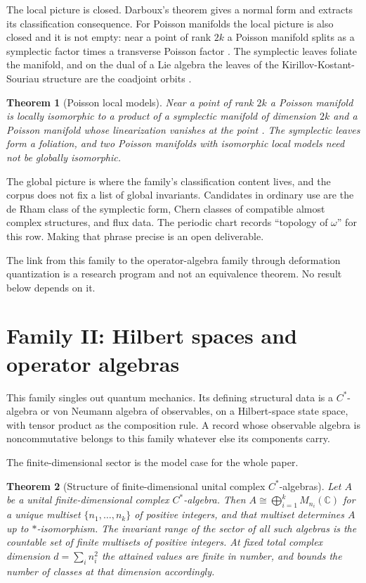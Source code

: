 \documentclass[11pt,letterpaper]{article}
\newtheorem{theorem}{Theorem}[section]
\theoremstyle{definition}
\theoremstyle{remark}
\begin{document}
The local picture is closed. Darboux's theorem gives a normal form and  extracts its classification consequence. For Poisson manifolds the local picture is also closed and it is not empty: near a point of rank $2k$ a Poisson manifold splits as a symplectic factor times a transverse Poisson factor \cite{poisson}. The symplectic leaves foliate the manifold, and on the dual of a Lie algebra the leaves of the Kirillov-Kostant-Souriau structure are the coadjoint orbits \cite{poisson}.

\begin{theorem}[Poisson local models]
\label{thm:weinstein}
Near a point of rank $2k$ a Poisson manifold is locally isomorphic to a product of a symplectic manifold of dimension $2k$ and a Poisson manifold whose linearization vanishes at the point \cite{weinstein}. The symplectic leaves form a foliation, and two Poisson manifolds with isomorphic local models need not be globally isomorphic.
\end{theorem}

The global picture is where the family's classification content lives, and the corpus does not fix a list of global invariants. Candidates in ordinary use are the de Rham class of the symplectic form, Chern classes of compatible almost complex structures, and flux data. The periodic chart records ``topology of $\omega$'' for this row. Making that phrase precise is an open deliverable.

The link from this family to the operator-algebra family through deformation quantization is a research program and not an equivalence theorem. No result below depends on it.

\section{Family II: Hilbert spaces and operator algebras}
\label{sec:family2}

This family singles out quantum mechanics. Its defining structural data is a $C^*$-algebra or von Neumann algebra of observables, on a Hilbert-space state space, with tensor product as the composition rule. A record whose observable algebra is noncommutative belongs to this family whatever else its components carry.

The finite-dimensional sector is the model case for the whole paper.

\begin{theorem}[Structure of finite-dimensional unital complex $C^*$-algebras]
\label{thm:calg}
Let $A$ be a unital finite-dimensional complex $C^*$-algebra. Then $A \cong \bigoplus_{i=1}^{k} M_{n_i}(\mathbb{C})$ for a unique multiset $\{n_1, \dots, n_k\}$ of positive integers, and that multiset determines $A$ up to $*$-isomorphism. The invariant range of the sector of all such algebras is the countable set of finite multisets of positive integers. At fixed total complex dimension $d = \sum_i n_i^2$ the attained values are finite in number, and  bounds the number of classes at that dimension accordingly.
\end{theorem}
\end{document}
